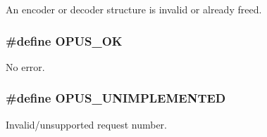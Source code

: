 An encoder or decoder structure is invalid or already freed. \hypertarget{group__opus__errorcodes_gaa44cf8a185e1b5cb940ef63eb4f02d21}{
\subsubsection[{OPUS\_\-OK}]{\setlength{\rightskip}{0pt plus 5cm}\#define OPUS\_\-OK}}
\label{group__opus__errorcodes_gaa44cf8a185e1b5cb940ef63eb4f02d21}


No error. \hypertarget{group__opus__errorcodes_ga3b8d73b0f44b8b925ff40fd7c02b14a0}{
\subsubsection[{OPUS\_\-UNIMPLEMENTED}]{\setlength{\rightskip}{0pt plus 5cm}\#define OPUS\_\-UNIMPLEMENTED}}
\label{group__opus__errorcodes_ga3b8d73b0f44b8b925ff40fd7c02b14a0}


Invalid/unsupported request number. 